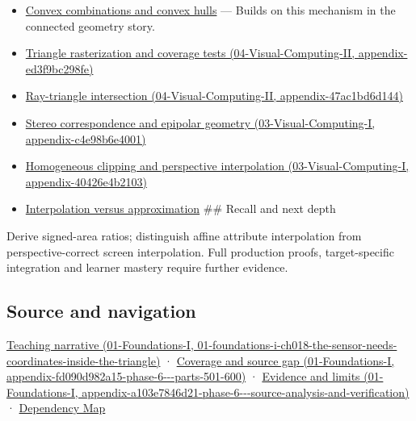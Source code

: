 \begin{itemize}
\item
  \hyperref[appendix-0026ec42c9d5]{Convex combinations and convex hulls} --- Builds on this mechanism in the connected geometry story.
\item
  \href{../04-Visual-Computing-II/main.pdf\#nameddest=appendix-ed3f9bc298fe}{Triangle rasterization and coverage tests (04-Visual-Computing-II, appendix-ed3f9bc298fe)}
\item
  \href{../04-Visual-Computing-II/main.pdf\#nameddest=appendix-47ac1bd6d144}{Ray-triangle intersection (04-Visual-Computing-II, appendix-47ac1bd6d144)}
\item
  \href{../03-Visual-Computing-I/main.pdf\#nameddest=appendix-c4e98b6e4001}{Stereo correspondence and epipolar geometry (03-Visual-Computing-I, appendix-c4e98b6e4001)}
\item
  \href{../03-Visual-Computing-I/main.pdf\#nameddest=appendix-40426e4b2103}{Homogeneous clipping and perspective interpolation (03-Visual-Computing-I, appendix-40426e4b2103)}
\item
  \hyperref[appendix-0c2a5f69851e]{Interpolation versus approximation} \#\# Recall and next depth
\end{itemize}

Derive signed-area ratios; distinguish affine attribute interpolation from perspective-correct screen interpolation. Full production proofs, target-specific integration and learner mastery require further evidence.

\subsection{Source and navigation}\label{appendix-02b9d9a81dca-source-and-navigation}

\href{../01-Foundations-I/main.pdf\#nameddest=01-foundations-i-ch018-the-sensor-needs-coordinates-inside-the-triangle}{Teaching narrative (01-Foundations-I, 01-foundations-i-ch018-the-sensor-needs-coordinates-inside-the-triangle)} · \href{../01-Foundations-I/main.pdf\#nameddest=appendix-fd090d982a15-phase-6---parts-501-600}{Coverage and source gap (01-Foundations-I, appendix-fd090d982a15-phase-6-\/-\/-parts-501-600)} · \href{../01-Foundations-I/main.pdf\#nameddest=appendix-a103e7846d21-phase-6---source-analysis-and-verification}{Evidence and limits (01-Foundations-I, appendix-a103e7846d21-phase-6-\/-\/-source-analysis-and-verification)} · \hyperref[appendix-4ad47bdd269a]{Dependency Map}


